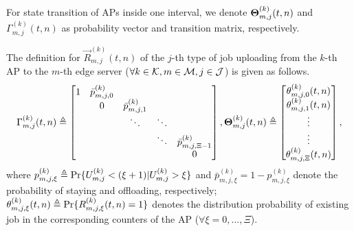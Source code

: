 For state transition of APs inside one interval, we denote $\boldsymbol{\Theta}^{(k)}_{m,j}(t,n)$ and ${\Gamma}^{(k)}_{m,j}(t,n)$ as probability vector and transition matrix, respectively.
\begin{definition}
    The definition for $\vec{R}^{(k)}_{m,j}(t,n)$ of the $j$-th type of job uploading from the $k$-th AP to the $m$-th edge server ($\forall k\in\mathcal{K}, m\in\mathcal{M}, j\in\mathcal{J}$) is given as follows.
    \begin{align}
        \Gamma^{(k)}_{m,j}(t,n) \triangleq
        \begin{bmatrix}
            1 & \bar{p}^{(k)}_{m,j,0} &                       &        &                           \\
            & 0                     & \bar{p}^{(k)}_{m,j,1} &        &                           \\
            &                       & \ddots                & \ddots &                           \\
            &                       &                       & \ddots & \bar{p}^{(k)}_{m,j,\Xi-1} \\
            &                       &                       &        & 0                         \\
        \end{bmatrix},
        \boldsymbol{\Theta}^{(k)}_{m,j}(t,n) \triangleq
        \begin{bmatrix}
            \theta^{(k)}_{m,j,0}(t,n) \\
            \theta^{(k)}_{m,j,1}(t,n) \\
            \vdots \\
            \vdots \\
            \theta^{(k)}_{m,j,\Xi}(t,n)
        \end{bmatrix},
    \end{align}
    where $p^{(k)}_{m,j,\xi} \triangleq \Pr\{U^{(k)}_{m,j} < (\xi+1) | U^{(k)}_{m,j}>\xi\}$ and $\bar{p}^{(k)}_{m,j,\xi} = 1 - p^{(k)}_{m,j,\xi}$ denote the probability of staying and offloading, respectively; $\theta^{(k)}_{m,j,\xi}(t,n) \triangleq \Pr\{R^{(k)}_{m,j,\xi}(t,n) = 1\}$ denotes the distribution probability of existing job in the corresponding counters of the AP ($\forall \xi=0,\dots,\Xi$).


\end{definition}
